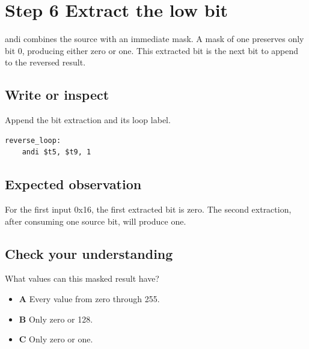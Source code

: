 \section{Step 6 Extract the low
  bit}\label{003-eight-byte-sprite-s06-step-6-extract-the-low-bit}

andi combines the source with an immediate mask. A mask of one preserves
only bit 0, producing either zero or one. This extracted bit is the next
bit to append to the reversed result.

\subsection{Write or
  inspect}\label{003-eight-byte-sprite-s06-write-or-inspect}

Append the bit extraction and its loop label.

\begin{verbatim}
reverse_loop:
    andi $t5, $t9, 1
\end{verbatim}

\subsection{Expected
  observation}\label{003-eight-byte-sprite-s06-expected-observation}

For the first input 0x16, the first extracted bit is zero. The second
extraction, after consuming one source bit, will produce one.

\subsection{Check your
  understanding}\label{003-eight-byte-sprite-s06-check-your-understanding}

What values can this masked result have?

\begin{itemize}
  \tightlist
  \item
        \textbf{A} Every value from zero through 255.
  \item
        \textbf{B} Only zero or 128.
  \item
        \textbf{C} Only zero or one.
\end{itemize}
